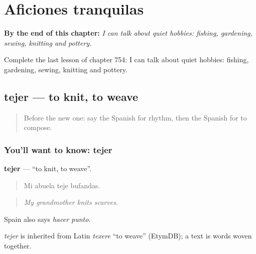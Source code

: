 
\chapter{Aficiones tranquilas}
\label{ch:es-aficiones-tranquilas}

\begin{chapteropening}
\textbf{By the end of this chapter:} \emph{I can talk about quiet hobbies: fishing, gardening, sewing, knitting and pottery.}

Complete the last lesson of chapter 754: I can talk about quiet hobbies: fishing, gardening, sewing, knitting and pottery.
\end{chapteropening}

\section[tejer]{tejer — to knit, to weave}

\label{lesson:ES-C754-tejer}



\begin{quote}
Before the new one: say the Spanish for rhythm, then the Spanish for to compose.
\end{quote}

\subsection*{You'll want to know: tejer}
\textbf{tejer} — \textquotedblleft{}to knit, to weave\textquotedblright{}.

\begin{quote}
Mi abuela teje bufandas.
\end{quote}

\begin{quote}
\emph{My grandmother knits scarves.}
\end{quote}

Spain also says \emph{hacer punto}.

\begin{cousinweb}
\emph{tejer} is inherited from Latin \emph{texere} \textquotedblleft{}to weave\textquotedblright{} (EtymDB); a text is words woven together.
\end{cousinweb}

